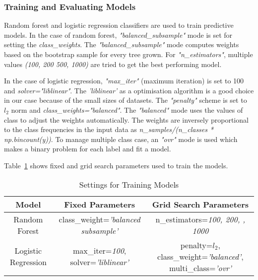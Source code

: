 \documentclass[english]{tktltiki2}
\theoremstyle{definition}
\theoremstyle{remark}
\begin{document}
\subsubsection{Training and Evaluating Models}
Random forest and logistic regression classifiers are used to train predictive models. In the case of random forest, \textit{"balanced\_subsample"} mode is set for setting the \textit{class\_weights}. The \textit{"balanced\_subsample"} mode computes weights based on the bootstrap sample for every tree grown. For \textit{"n\_estimators"}, multiple values \textit{(100, 200 500, 1000)} are tried to get the best performing model.

In the case of logistic regression, \textit{"max\_iter"} (maximum iteration) is set to 100 and \textit{solver="liblinear"}. The \textit{'liblinear'} as a optimisation algorithm is a good choice in our case because of the small sizes of datasets. The \textit{"penalty"} scheme is set to $l_2$ norm and \textit{class\_weights="balanced"}. The \textit{"balanced"} mode uses the values of class to adjust the weights automatically. The weights are inversely proportional to the class frequencies in the input data as  \textit{n\_samples/(n\_classes * np.bincount(y))}. To manage multiple class case, an \textit{"ovr"} mode is used which makes a binary problem for each label and fit a model. 

Table~\ref{table:training_models_datasets_UCI} shows fixed and grid search parameters used to train the models.


\begin{table}[H]
	\caption{Settings for Training Models}
	\label{table:training_models_datasets_UCI}
	\begin{center}
		\begin{tabular}{@{}ccc@{}}
			\toprule
			Model & Fixed Parameters & Grid Search Parameters \\ \hline

			\multicolumn{1}{|c|}{Random Forest} & \multicolumn{1}{p{40mm}|}{class\_weight=\textit{'balanced \newline subsample'}} & \multicolumn{1}{p{40mm}|}{n\_estimators=\textit{100, 200, \newline 500, 1000}} \\ \hline

			\multicolumn{1}{|c|}{Logistic Regression} & \multicolumn{1}{p{40mm}|}{max\_iter=\textit{100}, \newline solver=\textit{'liblinear'}} & \multicolumn{1}{p{40mm}|}{penalty=\textit{$l_2$},
			\newline class\_weight=\textit{'balanced'},
			\newline multi\_class=\textit{'ovr'}} \\ \hline
			

		\end{tabular}
	\end{center}
\end{table}
\end{document}
